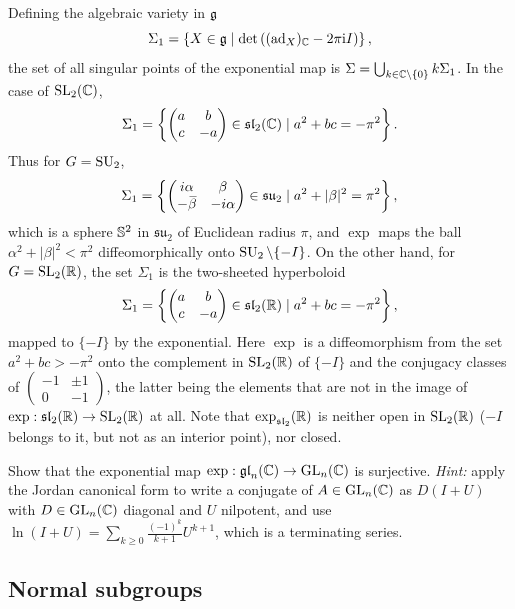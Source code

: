 \begin{example}
Defining the algebraic variety in $\mathfrak{g}$
\[\Sigma_1=\left\{X\in\mathfrak{g}\mid \det\left((\mathrm{ad}_X)_{\mathbb{C}} -2\pi\mathrm{i}  I\right)\right\},\]
the set of all singular points of the exponential map is $\Sigma=\bigcup_{k\in\mathbb{C}\setminus\{0\}} k\Sigma_1$. In the case of $\operatorname{SL}_2(\mathbb{C})$,
\[\Sigma_1=\left\{\begin{pmatrix}
    a&b\\c&-a
\end{pmatrix}\in\mathfrak{sl}_2(\mathbb{C})\mid a^2+bc=-\pi^2\right\}.\]
Thus for $G=\operatorname{SU}_2$,
\[\Sigma_1=\left\{\begin{pmatrix}
    i\alpha&\beta\\-\wb{\beta}&-i\alpha
\end{pmatrix}\in\mathfrak{su}_2\mid a^2+|\beta|^2=\pi^2\right\},\]
which is a sphere $\mathbb{S}^2$ in $\mathfrak{su}_2$ of Euclidean radius $\pi$, and $\exp$ maps the ball $\alpha^2+|\beta|^2<\pi^2$ diffeomorphically onto $\operatorname{SU}_2\setminus\{-I\}$. On the other hand, for $G=\operatorname{SL}_2(\mathbb{R})$, the set $\Sigma_1$ is the two-sheeted hyperboloid
\[\Sigma_1=\left\{\begin{pmatrix}
    a&b\\c&-a
\end{pmatrix}\in\mathfrak{sl}_2(\mathbb{R})\mid a^2+bc=-\pi^2\right\},\]
mapped to $\{-I\}$ by the exponential. Here $\exp$ is a diffeomorphism from the set $a^2+bc>-\pi^2$ onto the complement in $\operatorname{SL}_2(\mathbb{R})$ of $\{-I\}$ and the conjugacy classes of $\left(\begin{smallmatrix}
    -1&\pm1\\0&-1
\end{smallmatrix}\right)$, the latter being the elements that are not in the image of $\exp:\mathfrak{sl}_2(\mathbb{R})\to \operatorname{SL}_2(\mathbb{R})$ at all. Note that $\exp_{\mathfrak{sl}_2}(\mathbb{R})$ is neither open in $\operatorname{SL}_2(\mathbb{R})$ ($-I$ belongs to it, but not as an interior point), nor closed.
\end{example}

\begin{xca}
    Show that the exponential map $\exp:\mathfrak{gl}_n(\mathbb{C})\to \operatorname{GL}_n(\mathbb{C})$ is surjective. \emph{Hint:} apply the Jordan canonical form to write a conjugate of $A\in\operatorname{GL}_n(\mathbb{C})$ as $D(I+U)$ with $D\in\operatorname{GL}_n(\mathbb{C})$ diagonal and $U$ nilpotent, and use $\ln(I+U)=\sum_{k\geq 0} \frac{(-1)^k}{k+1}U^{k+1}$, which is a terminating series.
\end{xca}





\subsection{Normal subgroups}

